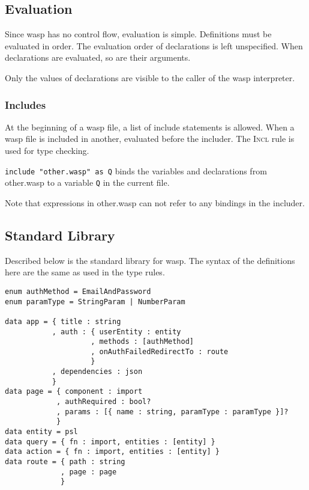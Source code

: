 \subsection{Evaluation}

Since wasp has no control flow, evaluation is simple. Definitions must be
evaluated in order. The evaluation order of declarations is left
unspecified. When declarations are evaluated, so are their arguments.

Only the values of declarations are visible to the caller of the wasp
interpreter.

\subsubsection{Includes}

At the beginning of a wasp file, a list of include statements is allowed. When
a wasp file is included in another, evaluated before the includer. The
\textsc{Incl} rule is used for type checking. 

\texttt{include "other.wasp" as Q} binds the variables and declarations from
other.wasp to a variable \texttt{Q} in the current file.

Note that expressions in other.wasp can not refer to any
bindings in the includer.

\subsection{Standard Library}

Described below is the standard library for wasp. The syntax of the definitions
here are the same as used in the type rules.

\begin{verbatim}
enum authMethod = EmailAndPassword
enum paramType = StringParam | NumberParam

data app = { title : string
           , auth : { userEntity : entity
                    , methods : [authMethod]
                    , onAuthFailedRedirectTo : route
                    }
           , dependencies : json
           }
data page = { component : import
            , authRequired : bool?
            , params : [{ name : string, paramType : paramType }]?
            }
data entity = psl
data query = { fn : import, entities : [entity] }
data action = { fn : import, entities : [entity] }
data route = { path : string
             , page : page
             }
\end{verbatim}

